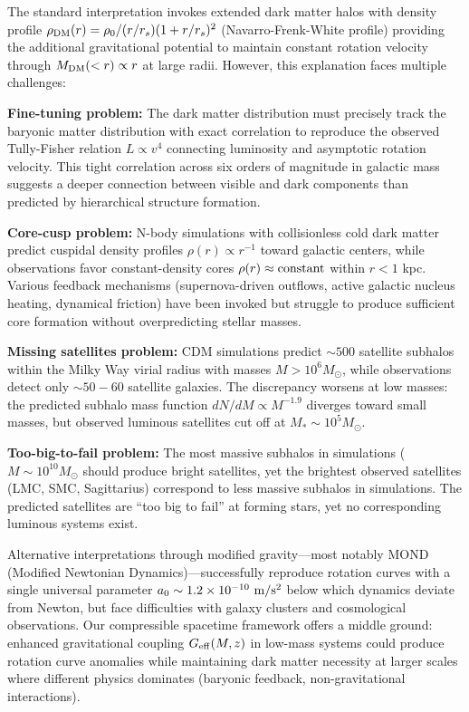 \documentclass[11pt,a4paper]{article}
\begin{document}
The standard interpretation invokes extended dark matter halos with
density profile \(\rho_{\rm DM}(r) = \rho_0/(r/r_s)(1+r/r_s)^2\)
(Navarro-Frenk-White profile) providing the additional gravitational
potential to maintain constant rotation velocity through
\(M_{\rm DM}(<r) \propto r\) at large radii. However, this explanation
faces multiple challenges:

\textbf{Fine-tuning problem:} The dark matter distribution must
precisely track the baryonic matter distribution with exact correlation
to reproduce the observed Tully-Fisher relation \(L \propto v^4\)
connecting luminosity and asymptotic rotation velocity. This tight
correlation across six orders of magnitude in galactic mass suggests a
deeper connection between visible and dark components than predicted by
hierarchical structure formation.

\textbf{Core-cusp problem:} N-body simulations \cite{Springel2005} with collisionless cold
dark matter predict cuspidal density profiles \(\rho(r) \propto r^{-1}\)
toward galactic centers, while observations favor constant-density cores
\(\rho(r) \approx {\rm constant}\) within \(r < 1\) kpc. Various
feedback mechanisms (supernova-driven outflows, active galactic nucleus
heating, dynamical friction) have been invoked but struggle to produce
sufficient core formation without overpredicting stellar masses.

\textbf{Missing satellites problem:} CDM simulations predict
\(\sim 500\) satellite subhalos within the Milky Way virial radius with
masses \(M > 10^6 M_\odot\), while observations detect only
\(\sim 50-60\) satellite galaxies. The discrepancy worsens at low
masses: the predicted subhalo mass function \(dN/dM \propto M^{-1.9}\)
diverges toward small masses, but observed luminous satellites cut off
at \(M_* \sim 10^5 M_\odot\).

\textbf{Too-big-to-fail problem:} The most massive subhalos in
simulations (\(M \sim 10^{10} M_\odot\) should produce bright
satellites, yet the brightest observed satellites (LMC, SMC,
Sagittarius) correspond to less massive subhalos in simulations. The
predicted satellites are ``too big to fail'' at forming stars, yet no
corresponding luminous systems exist.

Alternative interpretations through modified gravity---most notably MOND
(Modified Newtonian Dynamics)---successfully reproduce rotation curves
with a single universal parameter
\(a_0 \sim 1.2 \times 10^{-10}~{\rm m/s^2}\) below which dynamics
deviate from Newton, but face difficulties with galaxy clusters and
cosmological observations. Our compressible spacetime framework offers a
middle ground: enhanced gravitational coupling \(G_{\rm eff}(M,z)\) in
low-mass systems could produce rotation curve anomalies while
maintaining dark matter necessity at larger scales where different
physics dominates (baryonic feedback, non-gravitational interactions).
\end{document}
